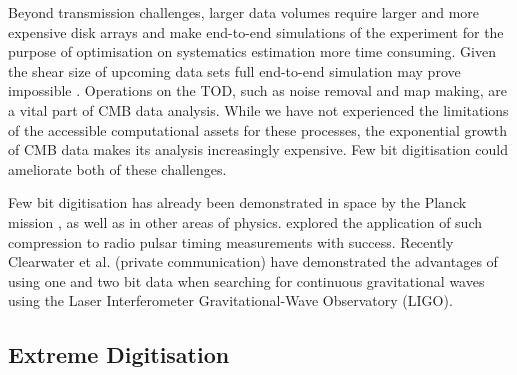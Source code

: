 \documentclass[apj]{emulateapj}
\begin{document}


Beyond transmission challenges, larger data volumes require larger and more expensive disk arrays and make end-to-end simulations of the experiment for the purpose of optimisation on systematics estimation more time consuming. Given the shear size of upcoming data sets full end-to-end simulation may prove impossible \citep{s4sciencebook}. Operations on the TOD, such as noise removal and map making, are a vital part of CMB data analysis. While we have not experienced the limitations of the accessible computational assets for these processes, the exponential growth of CMB data makes its analysis increasingly expensive. Few bit digitisation could ameliorate both of these challenges.



Few bit digitisation has already been demonstrated in space by the Planck mission \citep{maris2003}, as well as in other areas of physics. \cite{jenet1998} explored the application of such compression to radio pulsar timing measurements with success. Recently Clearwater et al. (private communication) have demonstrated the advantages of using one and two bit data when searching for continuous gravitational waves using the Laser Interferometer Gravitational-Wave Observatory (LIGO).


\subsection{Extreme Digitisation}
\label{subsec:extremedigitisation}
\end{document}
